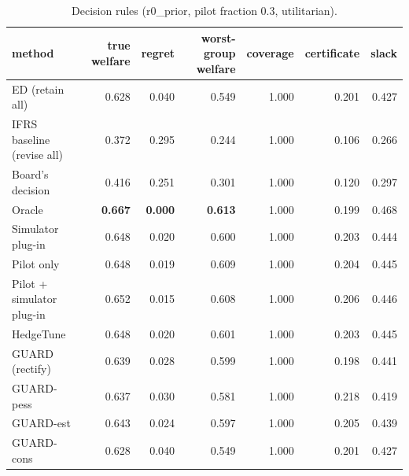 \begin{table}[t]
\centering
\small
\begin{tabular}{lrrrrrr}
\toprule
method & true welfare & regret & worst-group welfare & coverage & certificate & slack \\
\midrule
ED (retain all) & 0.628 & 0.040 & 0.549 & 1.000 & 0.201 & 0.427 \\
IFRS baseline (revise all) & 0.372 & 0.295 & 0.244 & 1.000 & 0.106 & 0.266 \\
Board's decision & 0.416 & 0.251 & 0.301 & 1.000 & 0.120 & 0.297 \\
Oracle & \textbf{0.667} & \textbf{0.000} & \textbf{0.613} & 1.000 & 0.199 & 0.468 \\
Simulator plug-in & 0.648 & 0.020 & 0.600 & 1.000 & 0.203 & 0.444 \\
Pilot only & 0.648 & 0.019 & 0.609 & 1.000 & 0.204 & 0.445 \\
Pilot + simulator plug-in & 0.652 & 0.015 & 0.608 & 1.000 & 0.206 & 0.446 \\
HedgeTune & 0.648 & 0.020 & 0.601 & 1.000 & 0.203 & 0.445 \\
GUARD (rectify) & 0.639 & 0.028 & 0.599 & 1.000 & 0.198 & 0.441 \\
GUARD-pess & 0.637 & 0.030 & 0.581 & 1.000 & 0.218 & 0.419 \\
GUARD-est & 0.643 & 0.024 & 0.597 & 1.000 & 0.205 & 0.439 \\
GUARD-cons & 0.628 & 0.040 & 0.549 & 1.000 & 0.201 & 0.427 \\
\bottomrule
\end{tabular}
\caption{Decision rules (r0\_prior, pilot fraction 0.3, utilitarian).}
\label{tab:methods-utilitarian}
\end{table}
